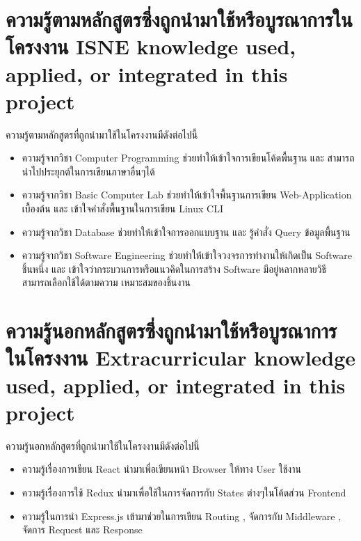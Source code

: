 \section{\ifcpe%
ความรู้ตามหลักสูตรซึ่งถูกนำมาใช้หรือบูรณาการในโครงงาน
\else%
ISNE knowledge used, applied, or integrated in this project
\fi
}

ความรู้ตามหลักสูตรที่ถูกนำมาใช้ในโครงงานมีดังต่อไปนี้
\begin{itemize}
  \item ความรู้จากวิชา Computer Programming ช่วยทำให้เข้าใจการเขียนโค้ดพื้นฐาน และ สามารถนำไปประยุกต์ในการเขียนภาษาอื่นๆได้
  \item ความรู้จากวิชา Basic Computer Lab ช่วยทำให้เข้าใจพื้นฐานการเขียน Web-Application เบื้องต้น และ เข้าใจคำสั่งพื้นฐานในการเขียน Linux CLI
  \item ความรู้จากวิชา Database ช่วยทำให้เข้าใจการออกแบบฐาน และ รู้คำสั่ง Query ข้อมูลพื้นฐาน
  \item ความรู้จากวิชา Software Engineering ช่วยทำให้เข้าใจวงจรการทำงานให้เกิดเป็น Software ชิ้นหนึ่ง และ เข้าใจว่ากระบวนการหรือแนวคิดในการสร้าง Software มีอยู่หลากหลายวิธี สามารถเลือกใช้ได้ตามความ
  เหมาะสมของชิ้นงาน 
  
\end{itemize}


\section{\ifcpe%
ความรู้นอกหลักสูตรซึ่งถูกนำมาใช้หรือบูรณาการในโครงงาน
\else%
Extracurricular knowledge used, applied, or integrated in this project
\fi
}

ความรู้นอกหลักสูตรที่ถูกนำมาใช้ในโครงงานมีดังต่อไปนี้
\begin{itemize}
  \item ความรู้เรื่องการเขียน React นำมาเพื่อเขียนหน้า Browser ให้ทาง User ใช้งาน
  \item ความรู้เรื่องการใช้ Redux นำมาเพื่อใช้ในการจัดการกับ States ต่างๆในโค้ดส่วน Frontend
  \item ความรู้ในการนำ Express.js เข้ามาช่วยในการเขียน Routing , จัดการกับ Middleware , จัดการ Request และ Response
\end{itemize}
